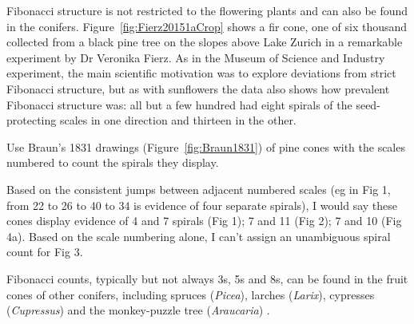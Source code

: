 Fibonacci structure is not restricted to the flowering plants and can also be found in the conifers. 
Figure~\ref{fig:Fierz20151aCrop} shows a fir cone, one of six thousand collected from a black pine tree on the slopes above Lake Zurich in a remarkable experiment by Dr Veronika Fierz. As in the Museum of Science and Industry experiment, the main scientific motivation was to explore deviations from strict Fibonacci structure, but as with sunflowers the data also shows how prevalent Fibonacci structure was: all but a few hundred had eight spirals of the seed-protecting scales in one direction and thirteen in the other. 
%
\clearpage
\begin{exercise}
	\label{ex:doitagain}
	Use Braun's 1831 drawings (Figure~\ref{fig:Braun1831}) of pine cones with the scales numbered to count the spirals they display.
\end{exercise}
\begin{solution}
Based on the consistent jumps between adjacent numbered scales (eg in Fig 1, from 22 to 26 to 40 to 34 is evidence of four separate spirals), I would say these cones display evidence of 4 and 7 spirals (Fig 1); 7 and 11 (Fig 2); 7 and 10 (Fig 4a). Based on the scale numbering alone, I can't assign an unambiguous spiral count  for Fig 3. 
\end{solution}

Fibonacci counts, typically but not always 3s, 5s and 8s, can be found in the fruit cones of other conifers, including spruces (\textit{Picea}), larches (\textit{Larix}),  cypresses (\textit{Cupressus}) \cite{fierzAberrantPhyllotacticPatterns2015} and the monkey-puzzle tree (\textit{Araucaria}) \cite{churchRelationPhyllotaxisMechanical1904}. 

\clearpage
